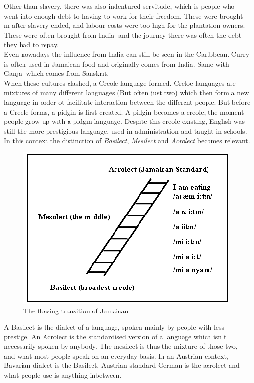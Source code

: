 \documentclass{article}
\begin{document}
	Other than slavery, there was also indentured servitude, which is people who went into enough debt to having to work for their freedom. These were brought in after slavery ended, and labour costs were too high for the plantation owners. These were often brought from India, and the journey there was often the debt they had to repay. \\
	Even nowadays the influence from India can still be seen in the Caribbean. Curry is often used in Jamaican food and originally comes from India. Same with Ganja, which comes from Sanskrit. \\
	When these cultures clashed, a Creole language formed. Creloe languages are mixtures of many different languages (But often just two) which then form a new language in order ot facilitate interaction between the different people. But before a Creole forms, a pidgin is first created. A pidgin becomes a creole, the moment people grow up with a pidgin language. Despite this creole existing, English was still the more prestigious language, used in administration and taught in schools. \\
	In this context the distinction of \textit{Basilect}, \textit{Mesilect} and \textit{Acrolect} becomes relevant. 
	\begin{figure}
	\includegraphics[scale=0.6]{Images/Jamaican.png}
	\caption{The flowing transition of Jamaican}
	\end{figure}
	A Basilect is the dialect of a language, spoken mainly by people with less prestige. An Acrolect is the standardised version of a language which isn't necessarily spoken by anybody. The mesilect is thus the mixture of those two, and what most people speak on an everyday basis. In an Austrian context, Bavarian dialect is the Basilect, Austrian standard German is the acrolect and what people use is anything inbetween. \\
\end{document}
